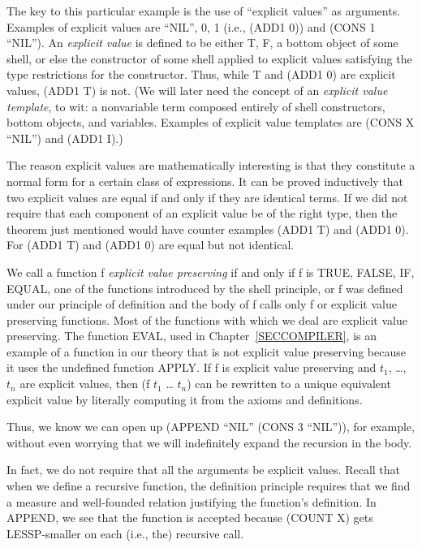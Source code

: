 \documentclass[10pt]{book}
\begin{document}
The key to this particular example is the use of ``explicit values'' as
arguments.  Examples of explicit values are ``NIL'', 0, 1 (i.e., (ADD1 0)) and
(CONS 1 ``NIL'').  An \emph{explicit value} is defined to be either T, F, a
bottom object of some shell, or else the constructor of some shell
applied to explicit values satisfying the type restrictions
for the constructor.  Thus, while T and (ADD1 0) are 
explicit values, (ADD1 T) is not.
(We will later need the concept of an \emph{explicit value template},
to wit: a nonvariable term composed entirely of
shell constructors, bottom objects,
and variables.  Examples of explicit value templates
are (CONS X ``NIL'') and (ADD1 I).)

The reason explicit values are mathematically interesting is that they
constitute a normal form for a certain class of expressions.  It can
be proved inductively that two explicit values are equal if and only if
they are identical terms.  If we did not require that each component
of an explicit value be of the right type, then
the theorem just mentioned would have counter examples
(ADD1 T) and (ADD1 0).  For (ADD1 T) and
(ADD1 0) are equal but not identical.

We call a function f \emph{explicit value preserving} if and only if f is
TRUE, FALSE, IF, EQUAL, one of the functions introduced by the
shell principle, or f was defined under our principle of definition
and the body of f calls only f or explicit value preserving functions.
Most of the functions with which we deal are explicit value preserving.
The function EVAL, used in Chapter~\ref{SECCOMPILER}, is an example of a
function in our theory that is not explicit value preserving because
it uses the undefined function APPLY.
If f is explicit value preserving and
$t_{1}$, \ldots{}, $t_{n}$ are explicit values, then
(f $t_{1}$ \ldots{} $t_{n}$) can be rewritten to a unique equivalent explicit value
by literally computing it from the axioms and definitions.

Thus, we know we can open up (APPEND ``NIL'' (CONS 3 ``NIL'')), for example,
without even worrying that we will indefinitely expand the recursion
in the body.

In fact, we do not require that all the arguments be explicit values.
 Recall that when we define a recursive function, the definition principle
requires that we find a measure and well-founded relation justifying the
function's definition.  In APPEND, we see that the function is accepted because
(COUNT X) gets LESSP-smaller on each (i.e., the) recursive call.
\end{document}
